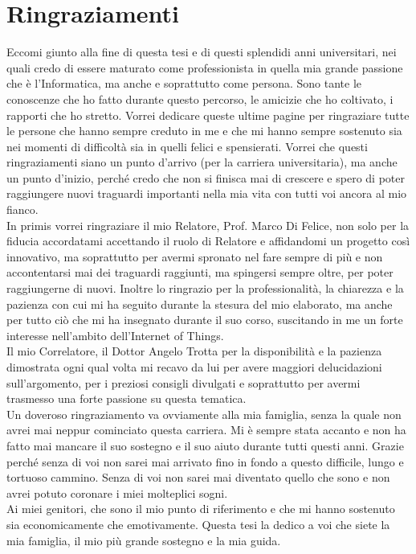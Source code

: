 \chapter*{Ringraziamenti}
\thispagestyle{empty}
\pagestyle{empty}
Eccomi giunto alla fine di questa tesi e di questi splendidi anni universitari, nei quali credo di essere maturato come professionista in quella mia grande passione che è l'Informatica, ma anche e soprattutto come persona. Sono tante le conoscenze che ho fatto durante questo percorso, le amicizie che ho coltivato, i rapporti che ho stretto. Vorrei dedicare queste ultime pagine per ringraziare tutte le persone che hanno sempre creduto in me e che mi hanno sempre sostenuto sia nei momenti di difficoltà sia in quelli felici e spensierati. Vorrei che questi ringraziamenti siano un punto d'arrivo (per la carriera universitaria), ma anche un punto d'inizio, perché credo che non si finisca mai di crescere e spero di poter raggiungere nuovi traguardi importanti nella mia vita con tutti voi ancora al mio fianco.\\

\noindent In primis vorrei ringraziare il mio Relatore, Prof. Marco Di Felice, non solo per la fiducia accordatami accettando il ruolo di Relatore e affidandomi un progetto così innovativo, ma soprattutto per avermi spronato nel fare sempre di più e non accontentarsi mai dei traguardi raggiunti, ma spingersi sempre oltre, per poter raggiungerne di nuovi.
Inoltre lo ringrazio per la professionalità, la chiarezza e la pazienza con cui mi ha seguito durante la stesura del mio elaborato, ma anche per tutto ciò che mi ha insegnato durante il suo corso, suscitando in me un forte interesse nell'ambito dell'Internet of Things.\\ 
Il mio Correlatore, il Dottor Angelo Trotta per la disponibilità e la pazienza dimostrata ogni qual volta mi recavo da lui per avere maggiori delucidazioni sull'argomento, per i preziosi consigli divulgati e soprattutto per avermi trasmesso una forte passione su questa tematica.\\

\noindent Un doveroso ringraziamento va ovviamente alla mia famiglia, senza la quale non avrei mai neppur cominciato questa carriera. Mi è sempre stata accanto e non ha fatto mai mancare il suo sostegno e il suo aiuto durante tutti questi anni. Grazie perché senza di voi non sarei mai arrivato fino in fondo a questo difficile, lungo e tortuoso cammino. Senza di voi non sarei mai diventato quello che sono e non avrei potuto coronare i miei molteplici sogni.\\
Ai miei genitori, che sono il mio punto di riferimento e che mi hanno sostenuto sia economicamente che emotivamente. Questa tesi la dedico a voi che siete la mia famiglia, il mio più grande sostegno e la mia guida.\\


